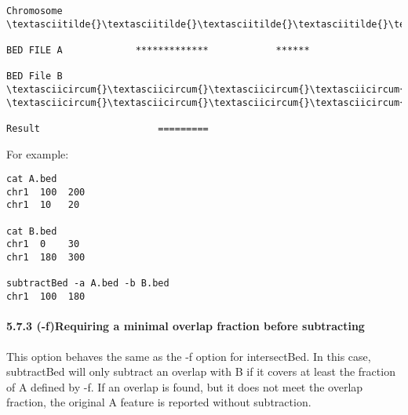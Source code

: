 \documentclass[letterpaper,10pt,english]{sphinxmanual}
\begin{document}
\begin{Verbatim}[commandchars=\\\{\}]
Chromosome  \textasciitilde{}\textasciitilde{}\textasciitilde{}\textasciitilde{}\textasciitilde{}\textasciitilde{}\textasciitilde{}\textasciitilde{}\textasciitilde{}\textasciitilde{}\textasciitilde{}\textasciitilde{}\textasciitilde{}\textasciitilde{}\textasciitilde{}\textasciitilde{}\textasciitilde{}\textasciitilde{}\textasciitilde{}\textasciitilde{}\textasciitilde{}\textasciitilde{}\textasciitilde{}\textasciitilde{}\textasciitilde{}\textasciitilde{}\textasciitilde{}\textasciitilde{}\textasciitilde{}\textasciitilde{}\textasciitilde{}\textasciitilde{}\textasciitilde{}\textasciitilde{}\textasciitilde{}\textasciitilde{}\textasciitilde{}\textasciitilde{}\textasciitilde{}\textasciitilde{}\textasciitilde{}\textasciitilde{}\textasciitilde{}\textasciitilde{}\textasciitilde{}\textasciitilde{}\textasciitilde{}\textasciitilde{}\textasciitilde{}\textasciitilde{}\textasciitilde{}\textasciitilde{}\textasciitilde{}\textasciitilde{}\textasciitilde{}\textasciitilde{}\textasciitilde{}\textasciitilde{}\textasciitilde{}\textasciitilde{}\textasciitilde{}\textasciitilde{}\textasciitilde{}\textasciitilde{}

BED FILE A             *************            ******

BED File B         \textasciicircum{}\textasciicircum{}\textasciicircum{}\textasciicircum{}\textasciicircum{}\textasciicircum{}\textasciicircum{}\textasciicircum{}                   \textasciicircum{}\textasciicircum{}\textasciicircum{}\textasciicircum{}\textasciicircum{}\textasciicircum{}\textasciicircum{}\textasciicircum{}\textasciicircum{}\textasciicircum{}\textasciicircum{}

Result                     =========
\end{Verbatim}

For example:

\begin{Verbatim}[commandchars=\\\{\}]
cat A.bed
chr1  100  200
chr1  10   20

cat B.bed
chr1  0    30
chr1  180  300

subtractBed -a A.bed -b B.bed
chr1  100  180
\end{Verbatim}


\paragraph{5.7.3  (-f)Requiring a minimal overlap fraction before subtracting}
\label{content/subtractBed:f-requiring-a-minimal-overlap-fraction-before-subtracting}
This option behaves the same as the -f option for intersectBed. In this case, subtractBed will only
subtract an overlap with B if it covers at least the fraction of A defined by -f. If an overlap is found,
but it does not meet the overlap fraction, the original A feature is reported without subtraction.
\end{document}
